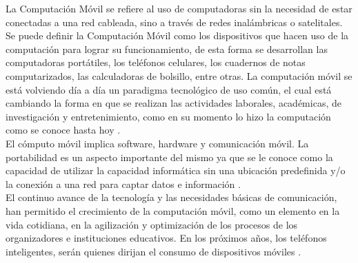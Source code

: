 
La Computación Móvil se refiere al uso de computadoras sin la necesidad de estar conectadas a una red cableada, sino a través de redes inalámbricas o satelitales. Se puede definir la Computación Móvil como los dispositivos que hacen uso de la computación para lograr su funcionamiento, de esta forma se desarrollan las computadoras portátiles, los teléfonos celulares, los cuadernos de notas computarizados, las calculadoras de bolsillo, entre otras. La computación móvil se está volviendo día a día un paradigma tecnológico de uso común, el cual está cambiando la forma en que se realizan las actividades laborales, académicas, de investigación y entretenimiento, como en su momento lo hizo la computación como se conoce hasta hoy \cite{MBDef}. \\

El cómputo móvil implica software, hardware y comunicación móvil. La portabilidad es un aspecto importante del mismo ya que se le conoce como la capacidad de utilizar la capacidad informática sin una ubicación predefinida y/o la conexión a una red para captar datos e información \cite{MBPDO}. \\

El continuo avance de la tecnología y las necesidades básicas de comunicación, han permitido el crecimiento de la computación móvil, como un elemento en la vida cotidiana, en la agilización y optimización de los procesos de los organizadores e instituciones educativos. En los próximos años, los teléfonos inteligentes, serán quienes dirijan el consumo de dispositivos móviles \cite{MBIntro}. \\

